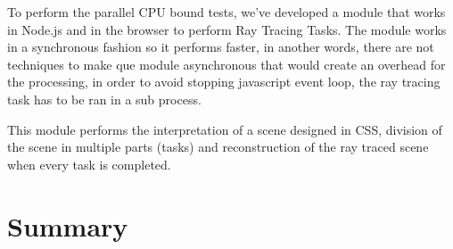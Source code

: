 To perform the parallel CPU bound tests, we've developed a module that works in Node.js and in the browser to perform Ray Tracing Tasks. The module works in a synchronous fashion so it performs faster, in another words, there are not techniques to make que module asynchronous that would create an overhead for the processing, in order to avoid stopping javascript event loop, the ray tracing task has to be ran in a sub process.

This module performs the interpretation of a scene designed in CSS, division of the scene in multiple parts (tasks) and reconstruction of the ray traced scene when every task is completed.

\section{Summary}


